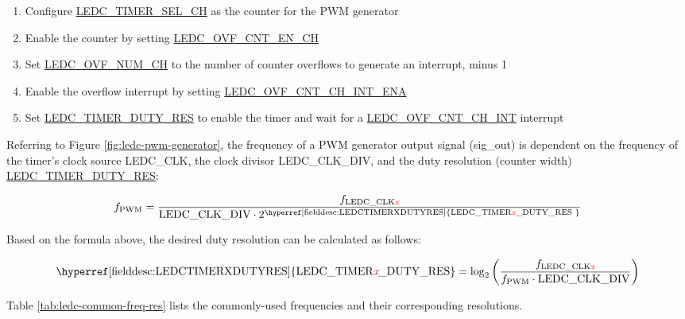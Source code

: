 \documentclass[main\_\_EN.tex]{subfiles}
\begin{document}
 \begin{enumerate}
    \item Configure \hyperref[fielddesc:LEDCTIMERSELCHN]{LEDC\_TIMER\_SEL\_CH} as the counter for the PWM generator
    \item Enable the counter by setting  \hyperref[fielddesc:LEDCOVFCNTENCHN]{LEDC\_OVF\_CNT\_EN\_CH}
    \item Set 
    \hyperref[fielddesc:LEDCOVFNUMCHN]{LEDC\_OVF\_NUM\_CH} to the number of counter overflows to generate an interrupt, minus 1
    \item Enable the overflow interrupt by setting \hyperref[fielddesc:LEDCOVFCNTCHNINTENA]{LEDC\_OVF\_CNT\_CH\_INT\_ENA}
    \item Set \hyperref[fielddesc:LEDCTIMERXDUTYRES]{LEDC\_TIMER\_DUTY\_RES} to enable the timer and 
    wait for a \hyperref[int:ledc-ovf-cnt]{LEDC\_OVF\_CNT\_CH\_INT} interrupt
\end{enumerate}

Referring to Figure \ref{fig:ledc-pwm-generator}, the frequency of a PWM generator output signal (sig\_out) is dependent on the frequency of the timer's clock source LEDC\_CLK, the clock divisor LEDC\_CLK\_DIV, and the duty resolution (counter width) \hyperref[fielddesc:LEDCTIMERXDUTYRES]{LEDC\_TIMER\_DUTY\_RES}:

    \[
    f_{\textrm{PWM}}=\frac{f_{\textrm{LEDC\_CLK\regindex{x}}}}
                        {\textrm{LEDC\_CLK\_DIV}\cdot 2^{\textrm{\hyperref[fielddesc:LEDCTIMERXDUTYRES]{LEDC\_TIMER\regindex{x}\_DUTY\_RES
                        }}}}
    \]

Based on the formula above, the desired duty resolution can be calculated as follows:

    \[
    \textrm{\hyperref[fielddesc:LEDCTIMERXDUTYRES]{LEDC\_TIMER\regindex{x}\_DUTY\_RES}}
    =\log_2\left(\frac{f_{\textrm{LEDC\_CLK\regindex{x}}}}
    {f_{\textrm{PWM}}\cdot \textrm{LEDC\_CLK\_DIV}}\right)
    \]

Table \ref{tab:ledc-common-freq-res} lists the commonly-used frequencies and their corresponding resolutions.
\end{document}
